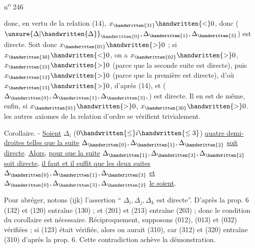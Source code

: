 n\textsuperscript{o} 246

donc, en vertu de la relation (14), $x_{\handwritten{31}}\handwritten{<}0$, donc ($\unsure{\Delta|\handwritten{\Delta}}_{\handwritten{0}},\Delta_{\handwritten{1}},\Delta_{\handwritten{3}}$) est directe. Soit donc $x_{\handwritten{01}}\handwritten{>}0$ ; si $x_{\handwritten{30}}\handwritten{<}0$, on a $x_{\handwritten{02}}\handwritten{>}0$, $x_{\handwritten{23}}\handwritten{>}0$ (parce que la seconde suite est directe), puis $x_{\handwritten{12}}\handwritten{>}0$ (parce que la première est directe), d'où $x_{\handwritten{13}}\handwritten{>}0$, d'après (14), et ($\Delta_{\handwritten{0}},\Delta_{\handwritten{1}},\Delta_{\handwritten{3}},$) est directe. Il en est de même, enfin, si $x_{\handwritten{01}}\handwritten{>}0$, $x_{\handwritten{30}}\handwritten{>}0$. les autres axiomes de la relation d'ordre se vérifient trivialement.

Corollaire. - \uline{Soient} $\Delta_i$ ($0\handwritten{\leq}i\handwritten{\leq3}$) \uline{quatre demi-droites telles que la suite} $\Delta_{\handwritten{0}},\Delta_{\handwritten{1}},\Delta_{\handwritten{2}}$ \uline{soit directe}. \uline{Alors}, \uline{pour que la suite} $\Delta_{\handwritten{1}},\Delta_{\handwritten{3}},\Delta_{\handwritten{2}}$ \uline{soit directe}, \uline{il faut et il suffit que les deux suites} $\Delta_{\handwritten{0}},\Delta_{\handwritten{1}},\Delta_{\handwritten{3}}$ \uline{et} $\Delta_{\handwritten{0}},\Delta_{\handwritten{3}},\Delta_{\handwritten{2}}$ \uline{le soient}.

Pour abréger, notons (ijk) l'assertion `` $\Delta_i,\Delta_j,\Delta_k$ est directe''. D'après la prop. 6 (132) et (120) entraîne (130) ; et (201) et (213) entraîne (203) ; donc le condition du corollaire est nécessaire. Réciproquement, supposons (012), (013) et (032) vérifiées ; si (123) était vérifiée, alors on aurait (310), car (312) et (320) entraîne (310) d'après la prop. 6. Cette contradiction achève la démonstration.

